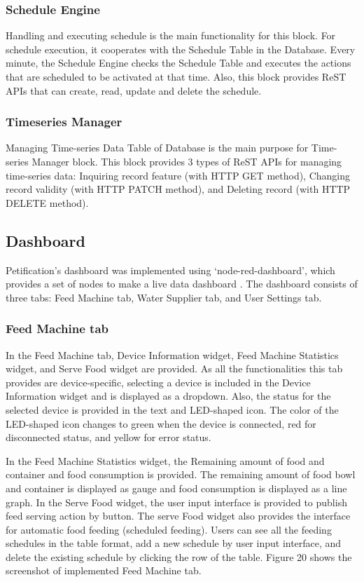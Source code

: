 \documentclass[conference]{IEEEtran}
\begin{document}
\subsubsection{Schedule Engine}
\hfill \break Handling and executing schedule is the main functionality for this block. For schedule execution, it cooperates with the Schedule Table in the Database. Every minute, the Schedule Engine checks the Schedule Table and executes the actions that are scheduled to be activated at that time. Also, this block provides ReST APIs that can create, read, update and delete the schedule.

\subsubsection{Timeseries Manager}
\hfill \break Managing Time-series Data Table of Database is the main purpose for Time-series Manager block. This block provides 3 types of ReST APIs for managing time-series data: Inquiring record feature (with HTTP GET method), Changing record validity (with HTTP PATCH method), and Deleting record (with HTTP DELETE method). 

\subsection{Dashboard}
Petification’s dashboard was implemented using ‘node-red-dashboard’, which provides a set of nodes to make a live data dashboard \cite{b19}.
The dashboard consists of three tabs: Feed Machine tab, Water Supplier tab, and User Settings tab.

\subsubsection{Feed Machine tab}
In the Feed Machine tab, Device Information widget, Feed Machine Statistics widget, and Serve Food widget are provided. As all the functionalities this tab provides are device-specific, selecting a device is included in the Device Information widget and is displayed as a dropdown.
Also, the status for the selected device is provided in the text and LED-shaped icon. The color of the LED-shaped icon changes to green when the device is connected, red for disconnected status, and yellow for error status.

In the Feed Machine Statistics widget, the Remaining amount of food and container and food consumption is provided. The remaining amount of food bowl and container is displayed as gauge and food consumption is displayed as a line graph.
In the Serve Food widget, the user input interface is provided to publish feed serving action by button. The serve Food widget also provides the interface for automatic food feeding (scheduled feeding). Users can see all the feeding schedules in the table format, add a new schedule by user input interface, and delete the existing schedule by clicking the row of the table. Figure 20 shows the screenshot of implemented Feed Machine tab.
\end{document}
